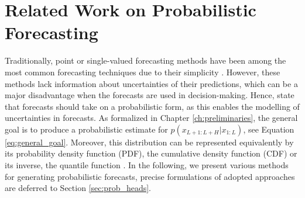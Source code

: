 \documentclass[a4paper,oneside,bibliography=totoc]{scrbook}
\begin{document}
\section{Related Work on Probabilistic Forecasting}
\label{sec:related_work_PF}
Traditionally, point or single-valued forecasting methods have been among the most common forecasting techniques due to their simplicity \cite{benidis_deep_2022}. However, these methods lack information about uncertainties of their predictions, which can be a major disadvantage when the forecasts are used in decision-making. Hence, \citet{gneiting_probabilistic_2014} state that forecasts should take on a probabilistic form, as this enables the modelling of uncertainties in forecasts. 
As formalized in Chapter \ref{ch:preliminaries}, the general goal is to produce a probabilistic estimate for $p(x_{L+1:L+H}| x_{1:L})$, see Equation \ref{eq:general_goal}.
Moreover, this distribution can be represented equivalently by its probability density function (PDF), the cumulative density function (CDF) or its inverse, the quantile function \cite{benidis_deep_2022}.
In the following, we present various methods for generating probabilistic forecasts, precise formulations of adopted approaches are deferred to Section \ref{sec:prob_heads}.
\end{document}
